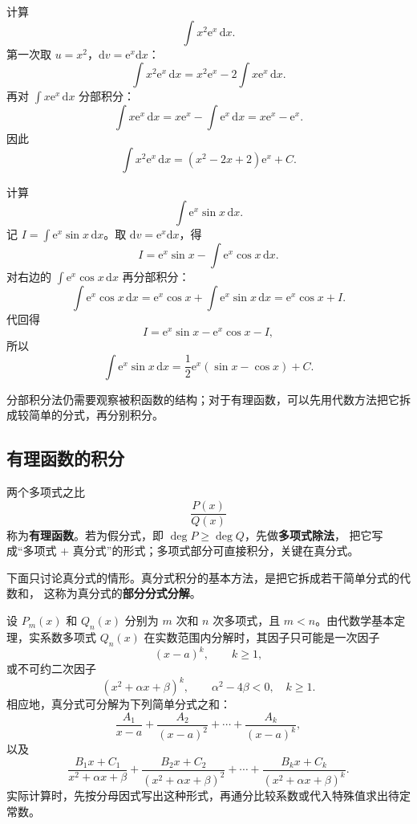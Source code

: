 \documentclass[fontset=fandol]{ctexart}
\newcommand{\dd}{\mathrm{d}}
\newcommand{\ee}{\mathrm{e}}
\begin{document}
\begin{example}[连续两次分部积分]
计算
\[
\int x^2\ee^x\,\dd x.
\]
第一次取 $u=x^2$，$\dd v=\ee^x\dd x$：
\[
\int x^2\ee^x\,\dd x=x^2\ee^x-2\int x\ee^x\,\dd x.
\]
再对 $\int x\ee^x\,\dd x$ 分部积分：
\[
\int x\ee^x\,\dd x=x\ee^x-\int \ee^x\,\dd x=x\ee^x-\ee^x.
\]
因此
\[
\int x^2\ee^x\,\dd x=(x^2-2x+2)\ee^x+C.
\]
\end{example}

\begin{example}[结果中出现原积分]
计算
\[
\int \ee^x\sin x\,\dd x.
\]
记 $I=\int \ee^x\sin x\,\dd x$。取 $\dd v=\ee^x\dd x$，得
\[
I=\ee^x\sin x-\int \ee^x\cos x\,\dd x.
\]
对右边的 $\int \ee^x\cos x\,\dd x$ 再分部积分：
\[
\int \ee^x\cos x\,\dd x=\ee^x\cos x+\int \ee^x\sin x\,\dd x=\ee^x\cos x+I.
\]
代回得
\[
I=\ee^x\sin x-\ee^x\cos x-I,
\]
所以
\[
\int \ee^x\sin x\,\dd x=\frac12\ee^x(\sin x-\cos x)+C.
\]
\end{example}

分部积分法仍需要观察被积函数的结构；对于有理函数，可以先用代数方法把它拆成较简单的分式，再分别积分。

\subsection{有理函数的积分}

两个多项式之比
\[
\frac{P(x)}{Q(x)}
\]
称为\textbf{有理函数}。若为假分式，即 $\deg P\geq \deg Q$，先做\textbf{多项式除法}，
把它写成“多项式 $+$ 真分式”的形式；多项式部分可直接积分，关键在真分式。

下面只讨论真分式的情形。真分式积分的基本方法，是把它拆成若干简单分式的代数和，
这称为真分式的\textbf{部分分式分解}。

设 $P_m(x)$ 和 $Q_n(x)$ 分别为 $m$ 次和 $n$ 次多项式，且 $m<n$。由代数学基本定理，实系数多项式 $Q_n(x)$ 在实数范围内分解时，其因子只可能是一次因子
\[
(x-a)^k,\qquad k\geq 1,
\]
或不可约二次因子
\[
(x^2+\alpha x+\beta)^k,\qquad \alpha^2-4\beta<0,\quad k\geq 1.
\]
相应地，真分式可分解为下列简单分式之和：
\[
\frac{A_1}{x-a}+\frac{A_2}{(x-a)^2}+\cdots+\frac{A_k}{(x-a)^k},
\]
以及
\[
\frac{B_1x+C_1}{x^2+\alpha x+\beta}
+\frac{B_2x+C_2}{(x^2+\alpha x+\beta)^2}
+\cdots+
\frac{B_kx+C_k}{(x^2+\alpha x+\beta)^k}.
\]
实际计算时，先按分母因式写出这种形式，再通分比较系数或代入特殊值求出待定常数。
\end{document}
